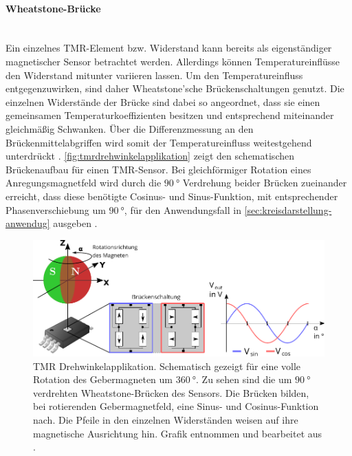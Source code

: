 \clearpage

\paragraph{Wheatstone-Brücke}\label{par:wheatstone-bruecke}$~$\\


Ein einzelnes TMR-Element bzw. Widerstand kann bereits als eigenständiger magnetischer Sensor betrachtet werden. Allerdings können Temperatureinflüsse den Widerstand mitunter variieren lassen. Um den Temperatureinfluss entgegenzuwirken, sind daher Wheatstone'sche Brückenschaltungen genutzt. Die einzelnen Widerstände der Brücke sind dabei so angeordnet, dass sie einen gemeinsamen Temperaturkoeffizienten besitzen und entsprechend miteinander gleichmäßig Schwanken. Über die Differenzmessung an den Brückenmittelabgriffen wird somit der Temperatureinfluss weitestgehend unterdrückt \cite{TDK2016}\cite{Tille2020}. \autoref{fig:tmrdrehwinkelapplikation} zeigt den schematischen Brückenaufbau für einen TMR-Sensor. Bei gleichförmiger Rotation eines Anregungsmagnetfeld wird durch die $\SI{90}{\degree}$ Verdrehung beider Brücken zueinander erreicht, dass diese benötigte Cosinus- und Sinus-Funktion, mit entsprechender Phasenverschiebung um $\SI{90}{\degree}$, für den Anwendungsfall in \autoref{sec:kreisdarstellung-anwendug} ausgeben \cite{TDK2016}. 


\vspace{5mm}
\begin{figure}[tbph]
	\centering
	\includegraphics[width=\linewidth]{chapters/images/2-Grundlagen/TMR_Drehwinkelapplikation}
	\caption[TMR Drehwinkelapplikation]{TMR Drehwinkelapplikation. Schematisch gezeigt für eine volle Rotation des 
		Gebermagneten um $\SI{360}{\degree}$. Zu sehen sind die um $\SI{90}{\degree}$ verdrehten Wheatstone-Brücken des 
		Sensors. Die Brücken bilden, bei rotierenden Gebermagnetfeld, eine Sinus- und Cosinus-Funktion nach. Die Pfeile in 
		den einzelnen Widerständen weisen auf ihre magnetische Ausrichtung hin. Grafik entnommen und bearbeitet aus 
		\cite{Schuethe2020a}.}
	\label{fig:tmrdrehwinkelapplikation}
\end{figure}
